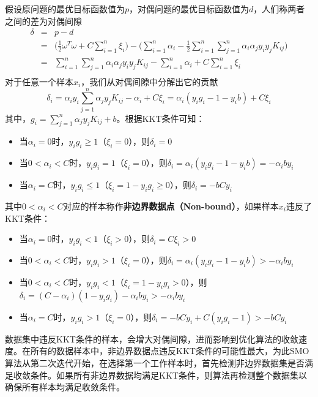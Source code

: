 假设原问题的最优目标函数值为$p$，对偶问题的最优目标函数值为$d$，人们称两者之间的差为对偶间隙
\begin{equation}
    \begin{array}{lll}
      \delta & = & p - d \\
       & = & \big(\frac{1}{2} \omega^T \omega + C\sum\limits_{i=1}^n \xi_i\big) - \big(\sum\limits_{i=1}^n \alpha_i - \frac{1}{2} \sum\limits_{i=1}^n \sum\limits_{j=1}^n \alpha_i \alpha_j y_i y_j K_{ij}\big)  \\
       & = & \sum\limits_{i=1}^n \sum\limits_{j=1}^n \alpha_i \alpha_j y_i y_j K_{ij} - \sum\limits_{i=1}^n \alpha_i + C\sum\limits_{i=1}^n \xi_i \\
    \end{array}
\end{equation}
对于任意一个样本$x_i$，我们从对偶间隙中分解出它的贡献
\begin{equation}
    \delta_i = \alpha_i y_i \sum\limits_{j=1}^n \alpha_j y_j K_{ij} - \alpha_i + C\xi_i = \alpha_i (y_i g_i - 1 - y_i b) + C\xi_i
\end{equation}
其中，$g_i = \sum\limits_{j=1}^n \alpha_j y_j K_{ij} + b$。根据KKT条件可知：
\begin{itemize}
  \item 当$\alpha_i = 0$时，$y_i g_i \ge 1$（$\xi_i=0$），则$\delta_i =  0$
  \item 当$0 < \alpha_i < C$时，$y_i g_i = 1$（$\xi_i=0$），则$\delta_i = \alpha_i (y_i g_i - 1 - y_i b)= - \alpha_i b y_i$
  \item 当$\alpha_i = C$时，$y_i g_i \le 1$（$\xi_i = 1 - y_i g_i \ge 0$），则$\delta_i = - b C y_i$
\end{itemize}
其中$0<\alpha_i<C$对应的样本称作\textbf{非边界数据点（Non-bound）}，如果样本$x_i$违反了KKT条件：
\begin{itemize}
  \item 当$\alpha_i = 0$时，$y_i g_i < 1$（$\xi_i> 0$），则$\delta_i = C\xi_i >0$
  \item 当$0 < \alpha_i < C$时，$y_i g_i > 1$（$\xi_i=0$），则$\delta_i = \alpha_i (y_i g_i - 1 - y_i b) > - \alpha_i b y_i$
  \item 当$0 < \alpha_i < C$时，$y_i g_i < 1$（$\xi_i= 1 - y_i g_i>0$），则$\delta_i = (C-\alpha_i)(1 - y_i g_i)-\alpha_i b y_i > - \alpha_i b y_i$
  \item 当$\alpha_i = C$时，$y_i g_i > 1$（$\xi_i=0$），则$\delta_i = - b C y_i + C (y_i g_i - 1)>- b C y_i $
\end{itemize}
数据集中违反KKT条件的样本，会增大对偶间隙，进而影响到优化算法的收敛速度。在所有的数据样本中，非边界数据点违反KKT条件的可能性最大，为此SMO算法从第二次迭代开始，在选择第一个工作样本时，首先检测非边界数据集是否满足收敛条件。如果所有非边界数据均满足KKT条件，则算法再检测整个数据集以确保所有样本均满足收敛条件。

